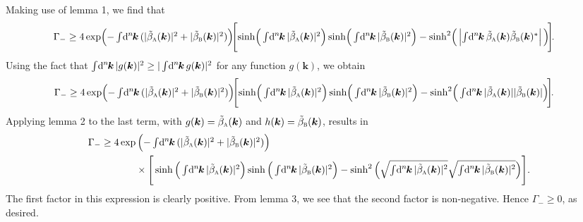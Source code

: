 \documentclass[pra,nofootinbib,floats,aps,twocolumn,tightenlines,superscriptaddress]{revtex4-1}
\renewcommand*\d[2][]{%
	\mathrm{d}%
	\ifx\relax#1\relax\else
	\rule{-0.02em}{1.5ex}^{#1}\rule{0.08em}{0ex}\!
	\fi
	#2\,
}
\newcommand{\bat}{\tilde{\beta}_\textsc{a}(\bm k)}
\newcommand{\bbt}{\tilde{\beta}_\textsc{b}(\bm k)}
\newcommand{\intk}{\begingroup\textstyle \int\endgroup \!\d[n]{\bm k}}
\begin{document}
Making use of lemma 1, we find that
\begin{align}
    \Gamma_-
    &\ge
    4\exp\!\left(-\intk(|\bat|^2+|\bbt|^2) \right)\!\!
    \Bigg[\!
    \sinh\!\Big(\intk|\bat|^2\Big)
    \sinh\!\Big(\intk|\bbt|^2\Big)
    -
    \sinh^2\!\Big(\left|\intk \bat\bbt^*\right|\Big)
    \!\Bigg]\!.
\end{align}
Using the fact that $\intk |g(\bm k)|^2\ge |\intk g(\bm k)|^2$ for any function $g(\bm k)$, we obtain
\begin{align}
    \Gamma_-
    &\ge
    4\exp\!\left(-\intk(|\bat|^2+|\bbt|^2) \right)\!\!
    \Bigg[\!
    \sinh\!\Big(\intk|\bat|^2\Big)
    \sinh\!\Big(\intk|\bbt|^2\Big)
    -
    \sinh^2\!\Big(\intk |\bat||\bbt|\Big)
    \!\Bigg]\!.
\end{align}
Applying lemma 2 to the last term, with $g(\bm k)=\bat$ and $h(\bm k)=\bbt$, results in
\begin{align}
    \Gamma_-
    \ge
    4\exp&\left(-\intk(|\bat|^2+|\bbt|^2) \right)
    \notag\\
    &\times
    \Bigg[
    \sinh\Big(\intk|\bat|^2\Big)
    \sinh\Big(\intk|\bbt|^2\Big)
    -
    \sinh^2\Big(\sqrt{\intk |\bat|^2}\sqrt{\intk|\bbt|^2}\Big)
    \Bigg].
\end{align}
The first factor in this expression is clearly positive. From lemma 3, we see that the second factor is non-negative. Hence $\Gamma_-\ge 0$, as desired.


\twocolumngrid



	
	
\end{document}
